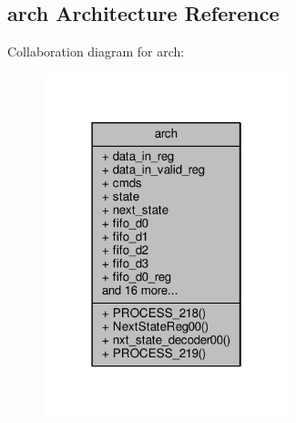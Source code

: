 \subsection{arch Architecture Reference}
\label{classdecompress_1_1arch}


Collaboration diagram for arch\+:\nopagebreak
\begin{figure}[H]
\begin{center}
\leavevmode
\includegraphics[width=202pt]{da/d4f/classdecompress_1_1arch__coll__graph}
\end{center}
\end{figure}
